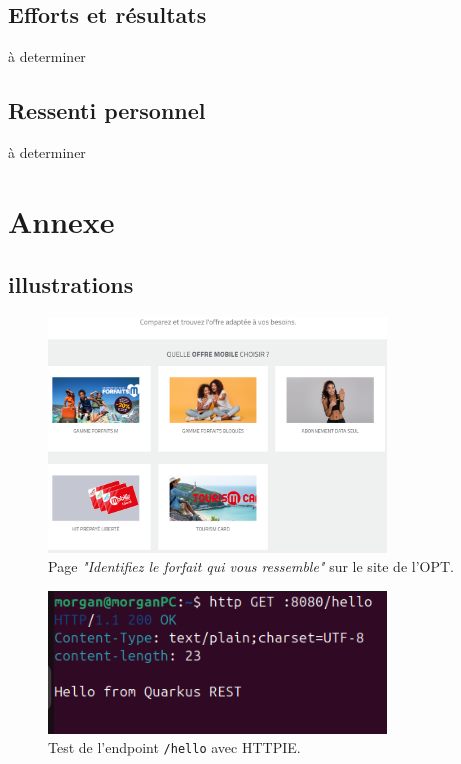 \documentclass{article}
\begin{document}
	\subsection{Efforts et résultats}
	
	à determiner
	
	\subsection{Ressenti personnel}
	
	à determiner
	
	\newpage
	\section{Annexe}
	\subsection{illustrations}
		\begin{figure}[H]
		\centering
		\includegraphics[width=0.8\textwidth]{asset/page_forfait.png}
		\caption{Page \textit{"Identifiez le forfait qui vous ressemble"} sur le site de l’OPT.}
		\label{fig:page_forfait}
	\end{figure}
	\begin{figure}[H]
		\centering
		\includegraphics[width=0.8\textwidth]{asset/hello.png}
		\caption{Test de l'endpoint \texttt{/hello} avec HTTPIE.}
		\label{fig:hello_endpoint}
	\end{figure}
\end{document}
